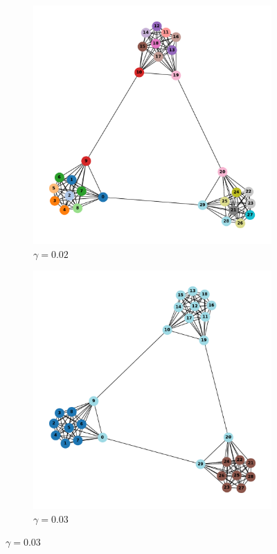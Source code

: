 \documentclass[12pt, letterpaper]{article}
\begin{document}
\begin{figure}
  \begin{subfigure}{0.5\textwidth}
    \centering
    \includegraphics[width=0.6\linewidth]{gammachange3,10gamma=0.02.pdf}
    \caption{$\gamma = 0.02$}
    \label{g1}
  \end{subfigure}
  \begin{subfigure}{0.5\textwidth}
    \centering
    \includegraphics[width=0.6\linewidth]{gammachange3,10gamma=0.003.pdf}
    \caption{$\gamma = 0.03$}
    \label{g2}
  \end{subfigure}

  \vfill


\end{figure}
\end{document}
